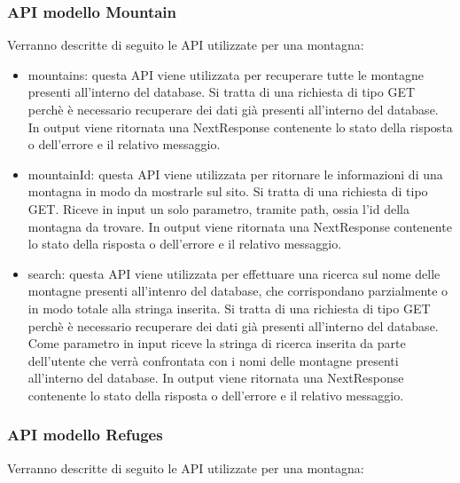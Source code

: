\documentclass[a4paper,12pt]{article}
\begin{document}
\subsubsection{API modello Mountain}
Verranno descritte di seguito le API utilizzate per una montagna:

\begin{itemize}
    \item mountains: \newline
    questa API viene utilizzata per recuperare tutte le montagne presenti all'interno del database. \newline
    Si tratta di una richiesta di tipo GET perchè è necessario recuperare dei dati già presenti all'interno del database. \newline
    In output viene ritornata una NextResponse contenente lo stato della risposta o dell'errore e il relativo messaggio. \newline
    \item mountainId: \newline
    questa API viene utilizzata per ritornare le informazioni di una montagna in modo da mostrarle sul sito. \newline
    Si tratta di una richiesta di tipo GET. \newline
    Riceve in input un solo parametro, tramite path, ossia l'id della montagna da trovare. \newline
    In output viene ritornata una NextResponse contenente lo stato della risposta o dell'errore e il relativo messaggio.
    \item search: \newline
    questa API viene utilizzata per effettuare una ricerca sul nome delle montagne presenti all'intenro del database, che corrispondano parzialmente o in modo totale alla stringa inserita. \newline
    Si tratta di una richiesta di tipo GET perchè è necessario recuperare dei dati già presenti all'interno del database. \newline
    Come parametro in input riceve la stringa di ricerca inserita da parte dell'utente che verrà confrontata con i nomi delle montagne presenti all'interno del database.\newline 
    In output viene ritornata una NextResponse contenente lo stato della risposta o dell'errore e il relativo messaggio.
\end{itemize}

\subsubsection{API modello Refuges}
Verranno descritte di seguito le API utilizzate per una montagna:
\end{document}
